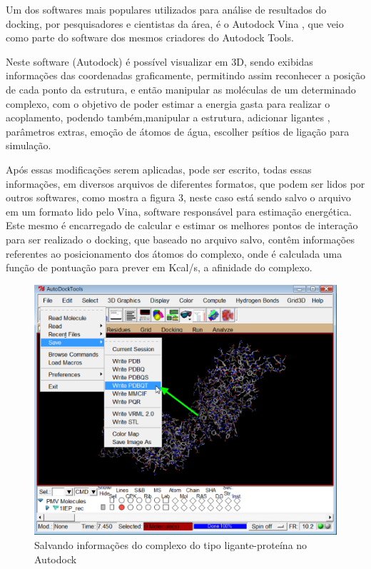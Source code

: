 \documentclass[tcc, capa]{texucpel}
\begin{document}
Um dos softwares mais populares utilizados para análise de resultados do docking, por pesquisadores e cientistas da área, é o Autodock Vina \cite{trott2010autodock}, que veio como parte do software dos mesmos criadores do Autodock Tools.

Neste software (Autodock)  é possível visualizar em 3D, sendo exibidas informações das coordenadas graficamente, permitindo assim reconhecer a posição de cada ponto da estrutura, e então manipular as moléculas de um determinado complexo, com o objetivo de poder estimar a energia gasta para realizar o acoplamento, podendo também,manipular a estrutura, adicionar ligantes , parâmetros extras,  emoção de átomos de água, escolher psítios de ligação para simulação.

Após essas modificações serem aplicadas, pode ser escrito, todas essas informações, em diversos arquivos de diferentes formatos, que podem ser lidos por outros softwares, como mostra a figura 3, neste caso está sendo salvo o arquivo em um formato lido pelo Vina, software responsável para estimação energética.\\Este mesmo é encarregado de calcular e estimar os melhores pontos de interação para ser realizado o docking, que baseado no arquivo salvo, contêm informações referentes ao posicionamento dos átomos do complexo, onde é calculada uma função de pontuação para prever em Kcal/s, a afinidade do complexo.

      \begin{figure}[H]
	\centering
	\includegraphics[width=0.90\linewidth]{imagens/Autodock.png}
	\caption{Salvando informações do complexo do tipo ligante-proteína no Autodock}
	\end{figure}
    \FloatBarrier
\end{document}
